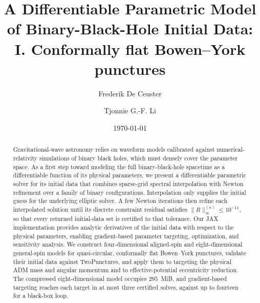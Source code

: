 \documentclass[
  aps,
  prd,
  twocolumn,
  10pt,
  amsmath,
  amssymb,
  nofootinbib,
  superscriptaddress,
  floatfix,
]{revtex4-2}
\newif\ifshowreferee \showrefereetrue
\newcommand{\refereetext}[1]{\ifshowreferee{\color{refereepurple}#1}\else#1\fi}
\begin{document}
\title{A Differentiable Parametric Model of Binary-Black-Hole Initial Data: \texorpdfstring{\\}{ }I. Conformally flat Bowen--York punctures}

\author{Frederik De Ceuster}

\author{Tjonnie G.-F. Li}

\date{\today}

\begin{abstract}
Gravitational-wave astronomy relies on waveform models calibrated against numerical-relativity simulations of binary black holes, which must densely cover the parameter space.
\refereetext{As a first step toward modeling the full binary-black-hole spacetime as a differentiable function of its physical parameters, we present a differentiable parametric solver for its initial data that combines sparse-grid spectral interpolation with Newton refinement over a family of binary configurations.}
Interpolation only supplies the initial guess for the underlying elliptic solver.
A few Newton iterations then refine each interpolated solution until its discrete constraint residual satisfies $\|R\|^{(u)}_\infty\le10^{-11}$, so that every returned initial-data set is certified to that tolerance.
Our JAX implementation provides analytic derivatives of the initial data with respect to the physical parameters, enabling gradient-based parameter targeting, optimization, and sensitivity analysis.
We construct four-dimensional aligned-spin and eight-dimensional general-spin models for quasi-circular, conformally flat Bowen--York punctures, validate their initial data against Two\-Punctures, and apply them to targeting the physical ADM mass and angular momentum and to effective-potential eccentricity reduction.
The compressed eight-dimensional model occupies $295$~MiB, and gradient-based targeting reaches each target in at most three certified solves, against up to fourteen for a black-box loop.
\end{abstract}
\end{document}
